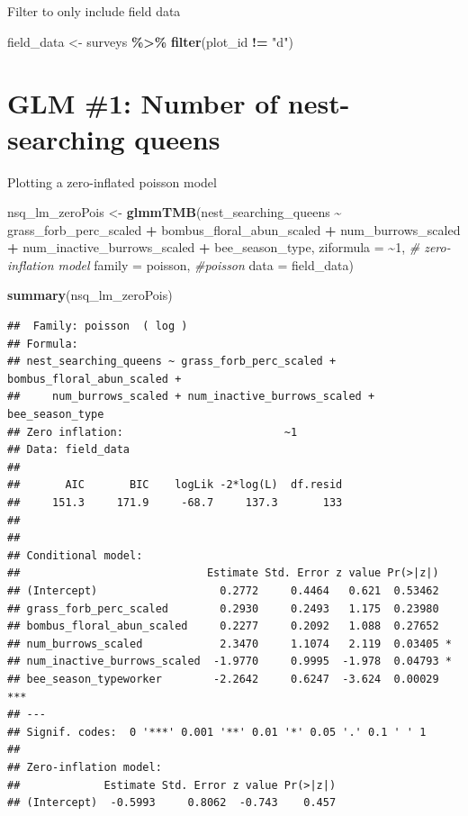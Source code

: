 \documentclass[
]{article}
\newenvironment{Shaded}{\begin{snugshade}}{\end{snugshade}}
\newcommand{\AttributeTok}[1]{\textcolor[rgb]{0.13,0.29,0.53}{#1}}
\newcommand{\CommentTok}[1]{\textcolor[rgb]{0.56,0.35,0.01}{\textit{#1}}}
\newcommand{\DecValTok}[1]{\textcolor[rgb]{0.00,0.00,0.81}{#1}}
\newcommand{\FunctionTok}[1]{\textcolor[rgb]{0.13,0.29,0.53}{\textbf{#1}}}
\newcommand{\NormalTok}[1]{#1}
\newcommand{\OtherTok}[1]{\textcolor[rgb]{0.56,0.35,0.01}{#1}}
\newcommand{\SpecialCharTok}[1]{\textcolor[rgb]{0.81,0.36,0.00}{\textbf{#1}}}
\newcommand{\StringTok}[1]{\textcolor[rgb]{0.31,0.60,0.02}{#1}}
\begin{document}
Filter to only include field data

\begin{Shaded}
\begin{Highlighting}[]
\NormalTok{field\_data }\OtherTok{\textless{}{-}}\NormalTok{ surveys }\SpecialCharTok{\%\textgreater{}\%}
  \FunctionTok{filter}\NormalTok{(plot\_id }\SpecialCharTok{!=} \StringTok{"d"}\NormalTok{)}
\end{Highlighting}
\end{Shaded}

\section{GLM \#1: Number of nest-searching
queens}\label{glm-1-number-of-nest-searching-queens}

Plotting a zero-inflated poisson model

\begin{Shaded}
\begin{Highlighting}[]
\NormalTok{nsq\_lm\_zeroPois }\OtherTok{\textless{}{-}} \FunctionTok{glmmTMB}\NormalTok{(nest\_searching\_queens }\SpecialCharTok{\textasciitilde{}}\NormalTok{ grass\_forb\_perc\_scaled }\SpecialCharTok{+} 
\NormalTok{                    bombus\_floral\_abun\_scaled }\SpecialCharTok{+} 
\NormalTok{                    num\_burrows\_scaled }\SpecialCharTok{+} 
\NormalTok{                     num\_inactive\_burrows\_scaled }\SpecialCharTok{+} 
\NormalTok{                    bee\_season\_type, }
                  \AttributeTok{ziformula =} \SpecialCharTok{\textasciitilde{}}\DecValTok{1}\NormalTok{,  }\CommentTok{\# zero{-}inflation model}
                  \AttributeTok{family =}\NormalTok{ poisson, }\CommentTok{\#poisson}
                  \AttributeTok{data =}\NormalTok{ field\_data)}

\FunctionTok{summary}\NormalTok{(nsq\_lm\_zeroPois)}
\end{Highlighting}
\end{Shaded}

\begin{verbatim}
##  Family: poisson  ( log )
## Formula:          
## nest_searching_queens ~ grass_forb_perc_scaled + bombus_floral_abun_scaled +  
##     num_burrows_scaled + num_inactive_burrows_scaled + bee_season_type
## Zero inflation:                         ~1
## Data: field_data
## 
##       AIC       BIC    logLik -2*log(L)  df.resid 
##     151.3     171.9     -68.7     137.3       133 
## 
## 
## Conditional model:
##                             Estimate Std. Error z value Pr(>|z|)    
## (Intercept)                   0.2772     0.4464   0.621  0.53462    
## grass_forb_perc_scaled        0.2930     0.2493   1.175  0.23980    
## bombus_floral_abun_scaled     0.2277     0.2092   1.088  0.27652    
## num_burrows_scaled            2.3470     1.1074   2.119  0.03405 *  
## num_inactive_burrows_scaled  -1.9770     0.9995  -1.978  0.04793 *  
## bee_season_typeworker        -2.2642     0.6247  -3.624  0.00029 ***
## ---
## Signif. codes:  0 '***' 0.001 '**' 0.01 '*' 0.05 '.' 0.1 ' ' 1
## 
## Zero-inflation model:
##             Estimate Std. Error z value Pr(>|z|)
## (Intercept)  -0.5993     0.8062  -0.743    0.457
\end{verbatim}
\end{document}

